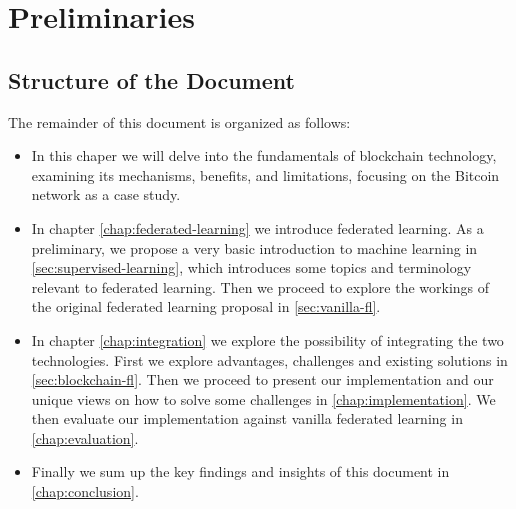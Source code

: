 \section{Preliminaries}\label{chap:introduction}



\subsection{Structure of the Document}

The remainder of this document is organized as follows:
\begin{itemize}
  \item In this chaper we will delve into the fundamentals of blockchain technology, examining its
    mechanisms, benefits, and limitations, focusing on the Bitcoin network as a case study.

  \item In chapter \ref{chap:federated-learning} we introduce federated learning. As a preliminary, we
    propose a very basic introduction to machine learning in \ref{sec:supervised-learning}, which
    introduces some topics and terminology relevant to federated learning. Then we proceed to explore the
    workings of the original federated learning proposal in \ref{sec:vanilla-fl}.
  \item In chapter \ref{chap:integration} we explore the possibility of integrating the two technologies.
    First we explore advantages, challenges and existing solutions in \ref{sec:blockchain-fl}. Then we
    proceed to present our implementation and our unique views on how to solve some challenges in
    \ref{chap:implementation}.
    We then evaluate our implementation against vanilla federated learning in \ref{chap:evaluation}.
  \item Finally we sum up the key findings and insights of this document in \ref{chap:conclusion}.
\end{itemize}
